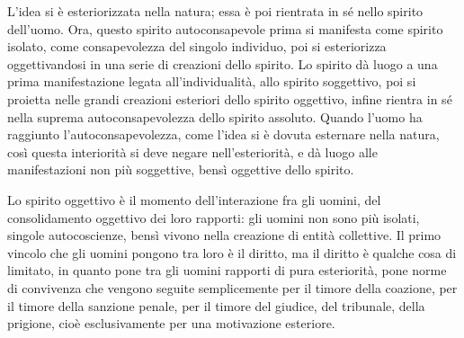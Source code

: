 \documentclass[a4paper,12pt,oneside,openany]{book}%
\begin{document}
L’idea si è esteriorizzata nella natura; essa è poi rientrata in sé nello spirito dell’uomo. Ora, questo spirito autoconsapevole prima si manifesta come spirito isolato, come consapevolezza del singolo individuo, poi si esteriorizza oggettivandosi in una serie di creazioni dello spirito. Lo spirito dà luogo a una prima manifestazione legata all’individualità, allo spirito soggettivo, poi si proietta nelle grandi creazioni esteriori dello spirito oggettivo, infine rientra in sé nella suprema autoconsapevolezza dello spirito assoluto. Quando l’uomo ha raggiunto l’autoconsapevolezza, come l’idea si è dovuta esternare nella natura, così questa interiorità si deve negare nell’esteriorità, e dà luogo alle manifestazioni non più soggettive, bensì oggettive dello spirito.

Lo spirito oggettivo è il momento dell’interazione fra gli uomini, del consolidamento oggettivo dei loro rapporti: gli uomini non sono più isolati, singole autocoscienze, bensì vivono nella creazione di entità collettive. Il primo vincolo che gli uomini pongono tra loro è il diritto, ma il diritto è qualche cosa di limitato, in quanto pone tra gli uomini rapporti di pura esteriorità, pone norme di convivenza che vengono seguite semplicemente per il timore della coazione, per il timore della sanzione penale, per il timore del giudice, del tribunale, della prigione, cioè esclusivamente per una motivazione esteriore.
\end{document}
